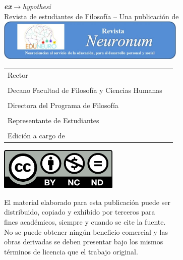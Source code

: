 {\small

\begin{center}
	{\Huge\textit{\textcolor{ehAzul1}{\textbf{ex}}\textcolor{ehAzul2}{$\rightarrow$}\textcolor{ehAzul1}{\vspace{-0.4cm}hypothesi}}}\\[0.5cm]
	Revista de estudiantes de Filosofía -- Una publicación de
	\includegraphics[width=9.021cm,height=1.984cm]{img/logo-neuronum.png}
\end{center}

\begin{longtable}[]{@{}ll@{}}
	\toprule
	\midrule
	\endhead
	Rector & \rector{}\tabularnewline
	&\tabularnewline
	Decano Facultad de Filosofía y Ciencias Humanas & \decano{}\tabularnewline
	&\tabularnewline
	Directora del Programa de Filosofía & \director{}\tabularnewline
	&\tabularnewline
	Representante de Estudiantes & \representante{}\tabularnewline
	&\tabularnewline
	Edición a cargo de & \editores{}\tabularnewline
	\bottomrule
\end{longtable}

\newpage

\begin{center}
	\includegraphics[width=2.24419in,height=0.78333in]{img/CC-BY-NC-ND.png}
\end{center}

\begin{flushleft}

El material elaborado para esta publicación puede ser\\
distribuido, copiado y exhibido por terceros para\\
fines académicos, siempre y cuando se cite la fuente.\\
No se puede obtener ningún beneficio comercial y las\\
obras derivadas se deben presentar bajo los mismos\\
términos de licencia que el trabajo original.


\end{flushleft}}
